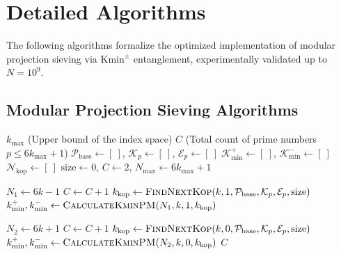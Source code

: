 \documentclass{article}
\numberwithin{equation}{section}
\theoremstyle{plain}
\theoremstyle{definition}
\begin{document}
\appendix
\section{Detailed Algorithms}
\label{app:algorithms}

The following algorithms formalize the optimized implementation of modular projection sieving via $\mathrm{Kmin}^\pm$ entanglement, experimentally validated up to $N=10^9$.

\subsection{Modular Projection Sieving Algorithms}

\begin{algorithm}[htbp]
\caption{Modular Projection Sieve with $\mathrm{Kmin}^\pm$ Entanglement}
\label{alg:sieve-kmin}
\begin{algorithmic}[1]
\Require $k_{\max}$ (Upper bound of the index space)
\Ensure $C$ (Total count of prime numbers $p \le 6k_{\max}+1$)
\State $\mathcal{P}_{\text{base}} \gets [\ ]$, $\mathcal{K}_p \gets [\ ]$, $\mathcal{E}_p \gets [\ ]$
\State $\mathcal{K}_{\min}^+ \gets [\ ]$, $\mathcal{K}_{\min}^- \gets [\ ]$ 
\State $\mathcal{N}_{\text{kop}} \gets [\ ]$ 
\State $\text{size} \gets 0$, $C \gets 2$, $N_{\max} \gets 6k_{\max} + 1$

    \State $N_1 \gets 6k - 1$ 
        \State $C \gets C + 1$
            \State $k_{\text{kop}} \gets \Call{FindNextKop}{k, 1, \mathcal{P}_{\text{base}}, \mathcal{K}_p, \mathcal{E}_p, \text{size}}$ 
            \State $k_{\min}^+, k_{\min}^- \gets \Call{CalculateKminPM}{N_1, k, 1, k_{\text{kop}}}$
            \State {}
        \EndIf
    \EndIf
    
    \State $N_2 \gets 6k + 1$ 
        \State $C \gets C + 1$
            \State $k_{\text{kop}} \gets \Call{FindNextKop}{k, 0, \mathcal{P}_{\text{base}}, \mathcal{K}_p, \mathcal{E}_p, \text{size}}$ 
            \State $k_{\min}^+, k_{\min}^- \gets \Call{CalculateKminPM}{N_2, k, 0, k_{\text{kop}}}$
            \State {}
        \EndIf
    \EndIf
\EndFor
\State \Return $C$
\end{algorithmic}
\end{algorithm}
\end{document}

